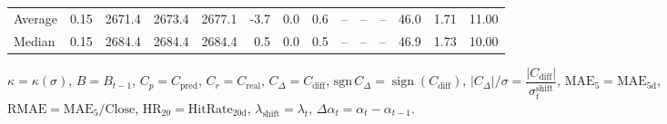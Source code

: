 \begin{threeparttable}
{\begin{tabular}{lrrrrrrrrrrrrr}
Average &     0.15 & 2671.4 & 2673.4 & 2677.1 &       -3.7 &                      0.0 &                 0.6 &         -- &        -- &             -- &             46.0 &            1.71 &                  11.00 \\
 Median &     0.15 & 2684.4 & 2684.4 & 2684.4 &        0.5 &                      0.0 &                 0.5 &         -- &        -- &             -- &             46.9 &            1.73 &                  10.00 \\
\bottomrule
\end{tabular}
}
\begin{tablenotes}\footnotesize
\item $\kappa=\kappa(\sigma)$, $B=B_{t-1}$, $C_p=C_{\text{pred}}$, $C_r=C_{\text{real}}$, $C_\Delta=C_{\text{diff}}$, $\mathrm{sgn}\,C_\Delta=\operatorname{sign}(C_{\text{diff}})$, $|C_\Delta|/\sigma=\dfrac{|C_{\text{diff}}|}{\sigma_t^{\text{shift}}}$, $\mathrm{MAE}_5=\mathrm{MAE}_{5\text{d}}$, $\mathrm{RMAE}= \mathrm{MAE}_5 / \text{Close}$, $\mathrm{HR}_{20}=\mathrm{HitRate}_{20\text{d}}$, 
$\lambda_{\text{shift}}=\lambda_t$, 
$\Delta\alpha_t=\alpha_t-\alpha_{t-1}$.
\end{tablenotes}
\end{threeparttable}
\endgroup
